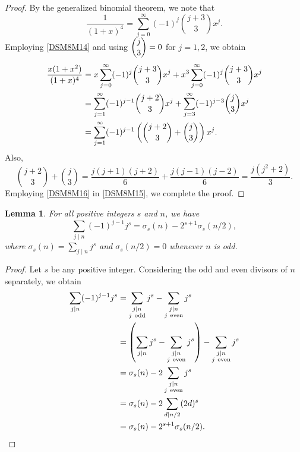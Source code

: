 \documentclass[12pt]{article}
\numberwithin{equation}{section}
\newtheorem{lemma}[theorem]{Lemma}
\theoremstyle{definition}
\theoremstyle{remark}
\numberwithin{equation}{section}
\begin{document}
\begin{proof}
By the generalized binomial theorem, we note that
\begin{equation}\label{DSM8M14}
\dfrac{1}{(1+x)^4}
=
\sum_{j=0}^{\infty}
(-1)^j
\binom{j+3}{3}x^j.
\end{equation}
Employing \eqref{DSM8M14} and using
$\dbinom{j}{3}=0$ for $j=1,2$, we obtain
\begin{align}
\dfrac{x(1+x^2)}{(1+x)^4}
&=
x\sum_{j=0}^{\infty}
(-1)^j\binom{j+3}{3}x^j
+
x^3\sum_{j=0}^{\infty}
(-1)^j\binom{j+3}{3}x^j
\notag\\
&=
\sum_{j=1}^{\infty}
(-1)^{j-1}\binom{j+2}{3}x^j
+
\sum_{j=3}^{\infty}
(-1)^{j-3}\binom{j}{3}x^j
\notag\\
&\label{DSM8M15}=
\sum_{j=1}^{\infty}
(-1)^{j-1}
\left(
\binom{j+2}{3}+\binom{j}{3}
\right)x^j.
\end{align}
Also, 
\begin{equation}\label{DSM8M16}
\binom{j+2}{3}+\binom{j}{3}
=
\dfrac{j(j+1)(j+2)}{6}
+
\dfrac{j(j-1)(j-2)}{6}
=
\dfrac{j(j^2+2)}{3}.
\end{equation}
Employing \eqref{DSM8M16} in \eqref{DSM8M15}, we complete the proof.
\end{proof}
\begin{lemma}\label{lem24}
   For all positive integers $s$ and $n$, we have 
   \begin{equation}\label{DSM8M20}
       \sum_{j\mid n}(-1)^{j-1}j^s=
\sigma_s(n)-2^{s+1}\sigma_s(n/2),
   \end{equation}
   where $\sigma_s(n)=\sum_{j\mid n}j^s$ and $\sigma_s(n/2)=0$ whenever $n$ is odd.
\end{lemma}
\begin{proof} Let $s$ be any positive integer.
Considering  the odd and even
divisors of $n$ separately, we obtain
\begin{align}
\sum_{j\mid n}(-1)^{j-1}j^s
&=
\sum_{\substack{j\mid n\\j\ {\rm odd}}}j^s
-
\sum_{\substack{j\mid n\\j\ {\rm even}}}j^s
\notag\\
&=
\left(
\sum_{j\mid n}j^s
-
\sum_{\substack{j\mid n\\j\ {\rm even}}}j^s
\right)
-
\sum_{\substack{j\mid n\\j\ {\rm even}}}j^s
\notag\\
&=
\sigma_s(n)
-
2\sum_{\substack{j\mid n\\j\ {\rm even}}}j^s
\notag\\
&=
\sigma_s(n)
-
2\sum_{d\mid n/2}(2d)^s
\notag\\
&=
\sigma_s(n)-2^{s+1}\sigma_s(n/2).\notag
\end{align}
\end{proof}
\end{document}
